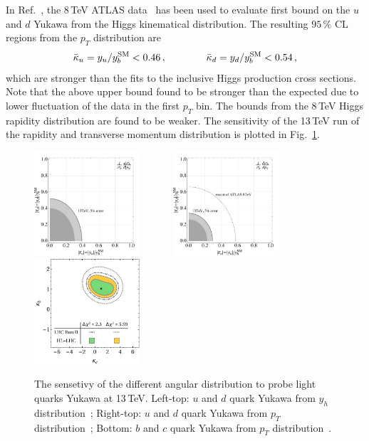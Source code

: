 \documentclass[../report.tex]{subfiles}
\begin{document}
In Ref.~\cite{Soreq:2016rae}, the 8\,TeV ATLAS data~\cite{Aad:2015lha} has been used to evaluate first bound on the $u$ and $d$ Yukawa from the Higgs kinematical distribution. The resulting $95\,\%$ CL regions from the  $p_T$ distribution are
%
\begin{align}
	\bar{\kappa}_u = y_u/y^{\rm SM}_b < 0.46 \, , \qquad\qquad
	\bar{\kappa}_d = y_d/y^{\rm SM}_b< 0.54 \, ,
\end{align}
%
which are stronger than the fits to the inclusive Higgs production cross sections. 
Note that the above upper bound found to be stronger than the expected due to lower fluctuation of the data in the first $p_T$ bin. 
The bounds from the 8\,TeV Higgs rapidity distribution are found to be weaker. 
The sensitivity of the 13\,TeV run of the rapidity and transverse momentum distribution is plotted in Fig.~\ref{fig:HiggsDistFuture}. 
\begin{figure}[t]
\begin{center}
\includegraphics[width=0.35\textwidth]{Naive13TeVy.pdf}~~~~~~
\includegraphics[width=0.35\textwidth]{Naive13TeVpT.pdf}\\
\includegraphics[width=0.35\textwidth]{future12.pdf}
\caption{The sensetivy of the different angular distribution to probe light quarks Yukawa at 13\,TeV.  
Left-top: $u$ and $d$ quark Yukawa from $y_h$ distribution~\cite{Soreq:2016rae};
Right-top: $u$ and $d$ quark Yukawa from $p_T$ distribution~\cite{Soreq:2016rae}; 
Bottom: $b$ and $c$ quark Yukawa from $p_T$ distribution~\cite{Bishara:2016jga}. 
}
\label{fig:HiggsDistFuture}
\end{center}
\end{figure}
\end{document}
